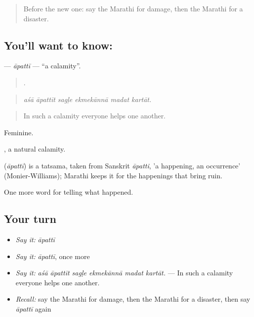 \label{lesson:MR-C295-apatti}



\begin{quote}
Before the new one: say the Marathi for damage, then the Marathi for a disaster.
\end{quote}

\subsection*{You'll want to know: }
\textbf{} — \emph{āpattī} — \textquotedblleft{}a calamity\textquotedblright{}.

\begin{quote}
     .
\end{quote}

\begin{quote}
\emph{aśā āpattīt sagḷe ekmekānnā madat kartāt.}
\end{quote}

\begin{quote}
In such a calamity everyone helps one another.
\end{quote}

Feminine.

 , a natural calamity.

\begin{cousinweb}
\textbf{} (\emph{āpattī}) is a tatsama, taken from Sanskrit \emph{āpatti}, 'a happening, an occurrence' (Monier-Williams); Marathi keeps it for the happenings that bring ruin.
\end{cousinweb}

\begin{grammarlens}[title={What you've built}]
One more word for telling what happened.
\end{grammarlens}

\subsection*{Your turn}
\begin{itemize}
\raggedright
  \item \emph{Say it:} \emph{āpattī}
  \item \emph{Say it:} \emph{āpattī}, once more
  \item \emph{Say it:} \emph{aśā āpattīt sagḷe ekmekānnā madat kartāt.} — In such a calamity everyone helps one another.
  \item \emph{Recall:} say the Marathi for damage, then the Marathi for a disaster, then say \emph{āpattī} again
\end{itemize}

